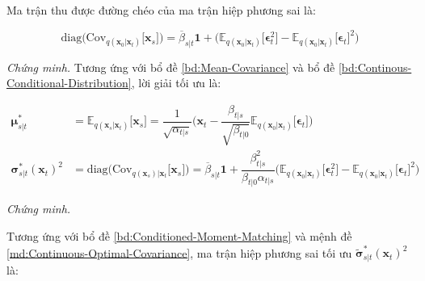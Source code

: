 \documentclass[14pt, a4paper]{article}
\numberwithin{equation}{section}
\numberwithin{figure}{section}
\numberwithin{dl}{section}
\numberwithin{md}{section}
\numberwithin{bd}{section}
\numberwithin{dn}{section}
\numberwithin{hq}{section}
\begin{document}
    Ma trận thu được đường chéo của ma trận hiệp phương sai là:

    \begin{equation}
        \mathrm{diag}\big( \mathrm{Cov}_{q(\boldsymbol{x}_0 \vert \boldsymbol{x}_t)} \lbrack \boldsymbol{x}_s \rbrack \big) = \overline{\beta}_{s \vert t} \boldsymbol{1} + \big( \mathbb{E}_{q(\boldsymbol{x}_0 \vert \boldsymbol{x}_t)} \lbrack \boldsymbol{\epsilon}_t^2 \rbrack - \mathbb{E}_{q(\boldsymbol{x}_0 \vert \boldsymbol{x}_t)} \lbrack \boldsymbol{\epsilon}_t \rbrack^2 \big)
    \end{equation}

    \continuousoptimalcovariance*

    \textit{Chứng minh.}
    Tương ứng với bổ đề \ref{bd:Mean-Covariance} và bổ đề \ref{bd:Continous-Conditional-Distribution}, lời giải tối ưu là:

    \begin{equation}
        \begin{aligned}
            \boldsymbol{\mu}_{s \vert t}^{\ast} &= \mathbb{E}_{q(\boldsymbol{x}_s \vert \boldsymbol{x}_t)} \lbrack \boldsymbol{x}_s \rbrack = \dfrac{1}{\sqrt{\alpha_{t \vert s}}} \big( \boldsymbol{x}_t - \dfrac{\beta_{t \vert s}}{\sqrt{\beta_{t \vert 0}}} \mathbb{E}_{q(\boldsymbol{x}_0 \vert \boldsymbol{x}_t)} \lbrack \boldsymbol{\epsilon}_t \rbrack \big) \\
            \boldsymbol{\sigma}_{s \vert t}^{\ast} (\boldsymbol{x}_t)^2 &= \mathrm{diag} \big( \mathrm{Cov}_{q(\boldsymbol{x}_s) \vert \boldsymbol{x}_t} \lbrack \boldsymbol{x}_s \rbrack \big) = \overline{\beta}_{s \vert t} \boldsymbol{1} + \dfrac{\beta_{t \vert s}^2}{\beta_{t \vert 0} \alpha_{t \vert s}} \big( \mathbb{E}_{q(\boldsymbol{x}_0 \vert \boldsymbol{x}_t)} \lbrack \boldsymbol{\epsilon}_t^2 \rbrack - \mathbb{E}_{q(\boldsymbol{x}_0 \vert \boldsymbol{x}_t)} \lbrack \boldsymbol{\epsilon}_t \rbrack^2 \big)
        \end{aligned}
    \end{equation}

    \continuouscorrectedoptimalcovariance*

    \textit{Chứng minh.}

    Tương ứng với bổ đề \ref{bd:Conditioned-Moment-Matching} và mệnh đề \ref{md:Continuous-Optimal-Covariance}, ma trận hiệp phương sai tối ưu $\tilde{\boldsymbol{\sigma}}_{s \vert t}^{\ast} (\boldsymbol{x}_t)^2$ là:
\end{document}
